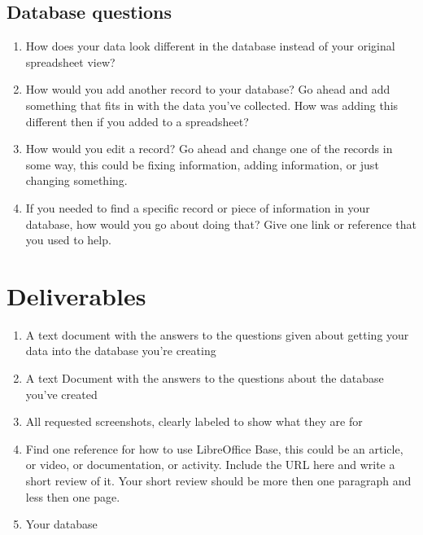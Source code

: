\documentclass[12pt]{article}
\begin{document}
    \subsection*{Database questions}
    \begin{enumerate}
        \item How does your data look different in the database instead of your original spreadsheet view?
        \item How would you add another record to your database?  Go ahead and add something that fits in with the data you've collected.  How was adding this different then if you added to a spreadsheet?
        \item How would you edit a record? Go ahead and change one of the records in some way, this could be fixing information, adding information, or just changing something. 
        \item If you needed to find a specific record or piece of information in your database, how would you go about doing that? Give one link or reference that you used to help.

    \end{enumerate}

\section*{Deliverables}
\begin{enumerate}
    \item A text document with the answers to the questions given about getting your data into the database you're creating
    \item A text Document with the answers to the questions about the database you've created
    \item All requested screenshots, clearly labeled to show what they are for
    \item Find one reference for how to use LibreOffice Base, this could be an article, or video, or documentation, or activity.  Include the URL here and write a short review of it. Your short review should be more then one paragraph and less then one page.
    \item Your database
\end{enumerate} 
\end{document}
